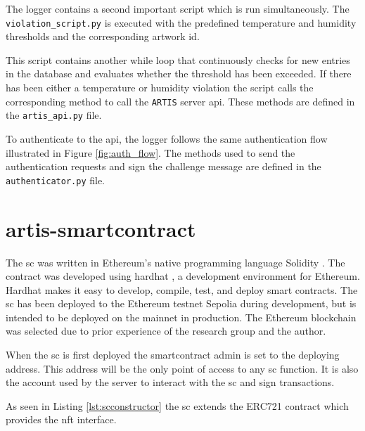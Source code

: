 The logger contains a second important script which is run simultaneously. The \texttt{violation\_script.py} is executed with the predefined temperature and humidity thresholds and the corresponding artwork id.



This script contains another while loop that continuously checks for new entries in the database and evaluates whether the threshold has been exceeded. If there has been either a temperature or humidity violation the script calls the corresponding method to call the \texttt{ARTIS} server \gls{api}. These methods are defined in the \texttt{artis\_api.py} file.

To authenticate to the \gls{api}, the logger follows the same authentication flow illustrated in Figure \ref{fig:auth_flow}. The methods used to send the authentication requests and sign the challenge message are defined in the \texttt{authenticator.py} file.

\section{artis-smartcontract}

The \gls{sc} was written in Ethereum's native programming language Solidity \cite{solidity}. The contract was developed using hardhat \cite{hardhat}, a development environment for Ethereum. Hardhat makes it easy to develop, compile, test, and deploy smart contracts. The \gls{sc} has been deployed to the Ethereum testnet Sepolia \cite{sepolia} during development, but is intended to be deployed on the mainnet in production. The Ethereum blockchain was selected due to prior experience of the research group and the author.

When the \gls{sc} is first deployed the smartcontract admin is set to the deploying address. This address will be the only point of access to any \gls{sc} function. It is also the account used by the server to interact with the \gls{sc} and sign transactions.



As seen in Listing \ref{lst:scconstructor} the \gls{sc} extends the ERC721 \cite{erc721} contract which provides the \gls{nft} interface.

